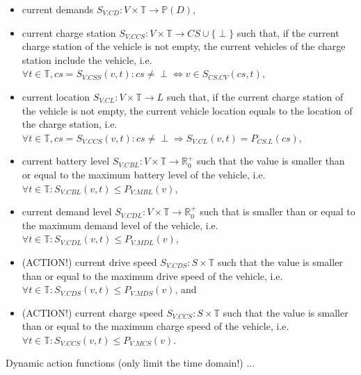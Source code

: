 \documentclass{IEEEtran}
\begin{document}
    \begin{itemize}
        \item current demands $S_{V.CD}: V \times \mathbb{T} \rightarrow \mathbb{P}(D)$,
        \item current charge station $S_{V.CCS}: V \times \mathbb{T} \rightarrow CS \cup \{\perp\}$ such that, if the current charge station of the vehicle is not empty, the current vehicles of the charge station include the vehicle, i.e.\ $\forall t \in \mathbb{T}, cs = S_{V.CSS}(v,t): cs \neq \perp \Leftrightarrow v \in S_{CS.CV}(cs,t)$,
        \item current location $S_{V.CL}: V \times \mathbb{T} \rightarrow L$ such that, if the current charge station of the vehicle is not empty, the current vehicle location equals to the location of the charge station, i.e.\ $\forall t \in \mathbb{T}, cs = S_{V.CCS}(v,t): cs \neq \perp \Rightarrow S_{V.CL}(v,t)=P_{CS.L}(cs)$,
        \item current battery level $S_{V.CBL}: V \times \mathbb{T} \rightarrow \mathbb{R}_0^+$ such that the value is smaller than or equal to the maximum battery level of the vehicle, i.e.\ $\forall t \in \mathbb{T}: S_{V.CBL}(v,t) \leq P_{V.MBL}(v)$,
        \item current demand level $S_{V.CDL}: V \times \mathbb{T} \rightarrow \mathbb{R}_0^+$ such that is smaller than or equal to the maximum demand level of the vehicle, i.e.\ $\forall t \in \mathbb{T}: S_{V.CDL}(v,t) \leq P_{V.MDL}(v)$,
        \item (ACTION!) current drive speed $S_{V.CDS}: S \times \mathbb{T}$ such that the value is smaller than or equal to the maximum drive speed of the vehicle, i.e.\ $\forall t \in \mathbb{T}: S_{V.CDS}(v,t) \leq P_{V.MDS}(v)$, and
        \item (ACTION!) current charge speed $S_{V.CCS}: S \times \mathbb{T}$ such that the value is smaller than or equal to the maximum charge speed of the vehicle, i.e.\ $\forall t \in \mathbb{T}: S_{V.CCS}(v,t) \leq P_{V.MCS}(v)$.
    \end{itemize}
    Dynamic action functions (only limit the time domain!) ...
\end{document}
